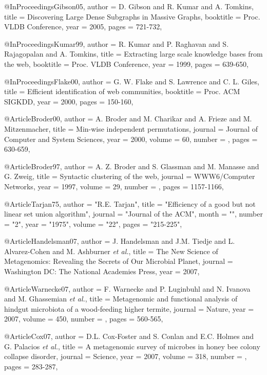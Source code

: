 @InProceedings{Gibson05,
  author = {D. Gibson and R. Kumar and A. Tomkins},
  title =  {Discovering Large Dense Subgraphs in Massive Graphs},
  booktitle = {Proc. VLDB Conference},
  year = {2005},
  pages =   {721-732},
}


@InProceedings{Kumar99,
  author = {R. Kumar and P. Raghavan and S. Rajagopalan and A. Tomkins},
  title =  {Extracting large scale knowledge bases from the web},
  booktitle = {Proc. VLDB Conference},
  year = {1999},
  pages =   {639-650},
}

@InProceedings{Flake00,
  author = {G. W. Flake and S. Lawrence and C. L. Giles},
  title =  {Efficient identification of web communities},
  booktitle = {Proc. ACM SIGKDD},
  year = {2000},
  pages =   {150-160},
}


@Article{Broder00,
  author = {A. Broder and M. Charikar and A. Frieze and M. Mitzenmacher},
  title =  { Min-wise independent permutations},
  journal = {Journal of Computer and System Sciences},
  year = {2000},
  volume =  {60},
  number =  {},
  pages =   {630-659},
}

@Article{Broder97,
  author = {A. Z. Broder and S. Glassman and M. Manasse and G. Zweig},
  title =  {Syntactic clustering of the web},
  journal = {{WWW6/Computer Networks}},
  year = {1997},
  volume =  {29},
  number =  {},
  pages =   {1157-1166},
}

@Article{Tarjan75,
   author =   "R.E. Tarjan",
   title =   "Efficiency of a good but not linear set union algorithm", 
   journal =   "Journal of the \uppercase{A}\uppercase{C}\uppercase{M}",
   month = "",
   number = "2",
   year =   "1975",
   volume =   "22",
   pages =   "215-225",
}



@Article{Handelsman07,
  author = {J. Handelsman and J.M. Tiedje and L. Alvarez-Cohen and M. Ashburner {\it et al.}},
  title =  {{The New Science of Metagenomics: Revealing the Secrets of Our Microbial Planet}},
  journal = {{Washington DC: The National Academies Press}},
  year = {2007},
}

@Article{Warnecke07,
  author = {F. Warnecke and P. Luginbuhl and N. Ivanova and M. Ghassemian {\it et al.}},
  title =  {Metagenomic and functional analysis of hindgut microbiota of a wood-feeding higher termite},
  journal = {Nature},
  year = {2007},
  volume =  {450},
  number =  {},
  pages =   {560-565},
}

@Article{Cox07,
  author = {D.L. Cox-Foster and S. Conlan and E.C. Holmes and G. Palacios {\it et al.}},
  title =  {A metagenomic survey of microbes in honey bee colony collapse disorder},
  journal = {Science},
  year = {2007},
  volume =  {318},
  number =  {},
  pages =   {283-287},
}

